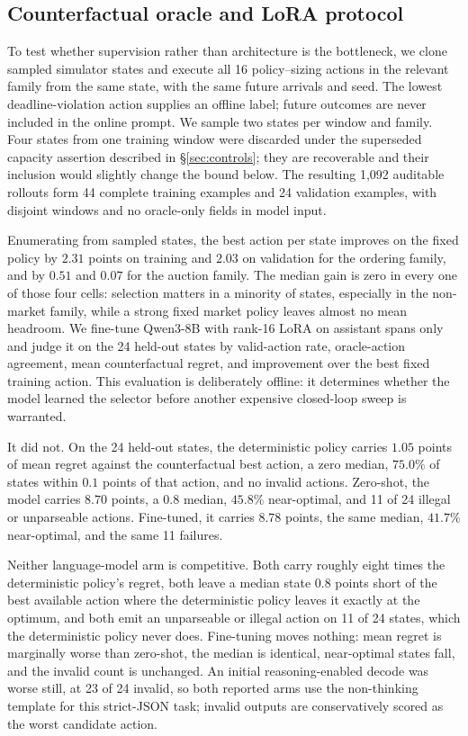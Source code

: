 \documentclass[conference]{IEEEtran}
\begin{document}
\subsection{Counterfactual oracle and LoRA protocol}
\label{sec:oracle}

To test whether supervision rather than architecture is the bottleneck, we clone sampled simulator
states and execute all 16 policy--sizing actions in the relevant family from the same state, with
the same future arrivals and seed.  The lowest deadline-violation action supplies an offline label;
future outcomes are never included in the online prompt.  We sample two states per window and
family.  Four states from one training window were discarded under the superseded capacity assertion described
in \S\ref{sec:controls}; they are recoverable and their inclusion would slightly change the bound below.  The resulting 1,092 auditable rollouts
form 44 complete training examples and 24 validation examples, with disjoint windows and no
oracle-only fields in model input.


Enumerating from sampled states, the best action per state improves on the fixed policy by $2.31$
points on training and $2.03$ on validation for the ordering family, and by $0.51$ and $0.07$ for the
auction family.  The median gain is zero in every one of those four cells: selection matters in a
minority of states, especially in the non-market family, while a strong fixed market policy leaves
almost no mean headroom.  We fine-tune Qwen3-8B with rank-16 LoRA on assistant spans only and judge
it on the 24 held-out states by valid-action rate, oracle-action agreement, mean counterfactual
regret, and improvement over the best fixed training action.  This evaluation is deliberately
offline: it determines whether the model learned the selector before another expensive closed-loop
sweep is warranted.

It did not.  On the 24 held-out states, the deterministic policy carries $1.05$ points of mean regret
against the counterfactual best action, a zero median, $75.0\%$ of states within $0.1$ points of that
action, and no invalid actions.  Zero-shot, the model carries $8.70$ points, a $0.8$ median, $45.8\%$
near-optimal, and 11 of 24 illegal or unparseable actions.  Fine-tuned, it carries $8.78$ points, the
same median, $41.7\%$ near-optimal, and the same 11 failures.


Neither language-model arm is competitive.  Both carry roughly eight times the deterministic policy's
regret, both leave a median state $0.8$ points short of the best available action where the
deterministic policy leaves it exactly at the optimum, and both emit an unparseable or illegal action
on 11 of 24 states, which the deterministic policy never does.  Fine-tuning moves nothing: mean regret
is marginally worse than zero-shot, the median is identical, near-optimal states fall, and the invalid
count is unchanged.  An initial reasoning-enabled decode was worse still, at 23 of 24 invalid, so both
reported arms use the non-thinking template for this strict-JSON task; invalid outputs are
conservatively scored as the worst candidate action.
\end{document}
